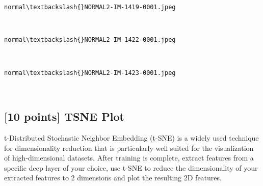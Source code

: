 \documentclass[11pt]{article}
\begin{document}
    \begin{Verbatim}[commandchars=\\\{\}]
normal\textbackslash{}NORMAL2-IM-1419-0001.jpeg
    \end{Verbatim}

    \begin{center}
    \end{center}
    { \hspace*{\fill} \\}
    
    \begin{Verbatim}[commandchars=\\\{\}]
normal\textbackslash{}NORMAL2-IM-1422-0001.jpeg
    \end{Verbatim}

    \begin{center}
    \end{center}
    { \hspace*{\fill} \\}
    
    \begin{Verbatim}[commandchars=\\\{\}]
normal\textbackslash{}NORMAL2-IM-1423-0001.jpeg
    \end{Verbatim}

    \begin{center}
    \end{center}
    { \hspace*{\fill} \\}
    
    \hypertarget{points-tsne-plot}{%
\subsection{{[}10 points{]} TSNE Plot}\label{points-tsne-plot}}

t-Distributed Stochastic Neighbor Embedding (t-SNE) is a widely used
technique for dimensionality reduction that is particularly well suited
for the visualization of high-dimensional datasets. After training is
complete, extract features from a specific deep layer of your choice,
use t-SNE to reduce the dimensionality of your extracted features to 2
dimensions and plot the resulting 2D features.
\end{document}
